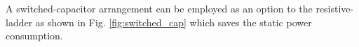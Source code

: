 A switched-capacitor arrangement can be employed as an option to the resistive-ladder as shown in Fig. \ref{fig:switched_cap} which saves the static power consumption.
%
\begin{figure}[h!]
\centering
{}\\
\qquad
{}

\end{figure}
